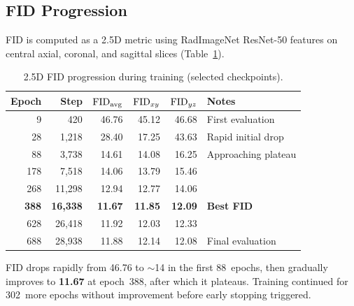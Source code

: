 \subsection{FID Progression}

FID is computed as a 2.5D metric using RadImageNet ResNet-50 features on
central axial, coronal, and sagittal slices (Table~\ref{tab:fid}).

\begin{table}[ht]
\centering
\caption{2.5D FID progression during training (selected checkpoints).}
\label{tab:fid}
\begin{tabular}{rrrrrl}
\toprule
\textbf{Epoch} & \textbf{Step} & $\mathrm{FID}_{\mathrm{avg}}$ & $\mathrm{FID}_{xy}$ & $\mathrm{FID}_{yz}$ & \textbf{Notes} \\
\midrule
9    & 420    & 46.76 & 45.12 & 46.68 & First evaluation \\
28   & 1,218  & 28.40 & 17.25 & 43.63 & Rapid initial drop \\
88   & 3,738  & 14.61 & 14.08 & 16.25 & Approaching plateau \\
178  & 7,518  & 14.06 & 13.79 & 15.46 & \\
268  & 11,298 & 12.94 & 12.77 & 14.06 & \\
\textbf{388} & \textbf{16,338} & \textbf{11.67} & \textbf{11.85} & \textbf{12.09} & \textbf{Best FID} \\
628  & 26,418 & 11.92 & 12.03 & 12.33 & \\
688  & 28,938 & 11.88 & 12.14 & 12.08 & Final evaluation \\
\bottomrule
\end{tabular}
\end{table}

FID drops rapidly from 46.76 to ${\sim}$14 in the first 88~epochs, then
gradually improves to \textbf{11.67} at epoch~388, after which it plateaus.
Training continued for 302~more epochs without improvement before early
stopping triggered.
